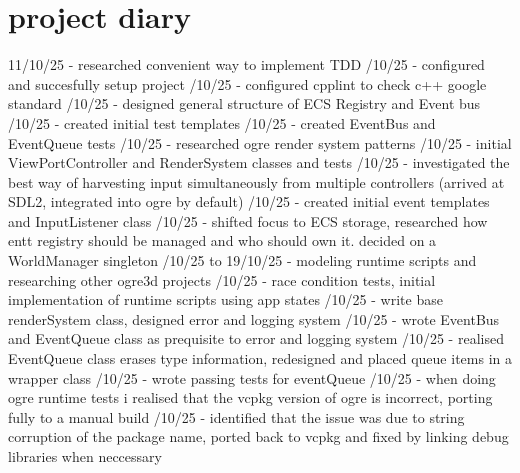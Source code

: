 \documentclass[]{final_report}
\begin{document}
\section{project diary}
11/10/25 - researched convenient way to implement TDD /10/25 - configured and succesfully setup project /10/25 - configured cpplint to check c++ google standard /10/25 - designed general structure of ECS Registry and Event bus /10/25 - created initial test templates /10/25 - created EventBus and EventQueue tests /10/25 - researched ogre render system patterns /10/25 - initial ViewPortController and RenderSystem classes and tests /10/25 - investigated the best way of harvesting input simultaneously from multiple controllers (arrived at SDL2, integrated into ogre by default) /10/25 - created initial event templates and InputListener class /10/25 - shifted focus to ECS storage, researched how entt registry should be managed and who should own it. decided on a WorldManager singleton /10/25 to 19/10/25 - modeling runtime scripts and researching other ogre3d projects /10/25 - race condition tests, initial implementation of runtime scripts using app states /10/25 - write base renderSystem class, designed error and logging system /10/25 - wrote EventBus and EventQueue class as prequisite to error and logging system /10/25 - realised EventQueue class erases type information, redesigned and placed queue items in a wrapper class /10/25 - wrote passing tests for eventQueue /10/25 - when doing ogre runtime tests i realised that the vcpkg version of ogre is incorrect, porting fully to a manual build /10/25 - identified that the issue was due to string corruption of the package name, ported back to vcpkg and fixed by linking debug libraries when neccessary \newline
\end{document}
